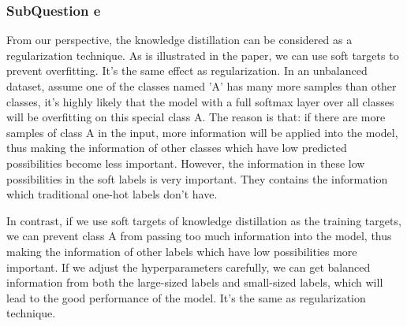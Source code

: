 \documentclass[conference]{IEEEtran}
\begin{document}
  \subsubsection{SubQuestion e}
  From our perspective, the knowledge distillation can be considered as a regularization technique. As is illustrated in the paper\cite{b6}, we can use soft targets to prevent overfitting. It's the same effect as regularization.
  In an unbalanced dataset, assume one of the classes named 'A' has many more samples than other classes, it's highly likely that the model with a full softmax layer over all classes will be overfitting on this special class A.
  The reason is that: if there are more samples of class A in the input, more information will be applied into the model, thus making the information of other classes which have low predicted possibilities become less important. 
  However, the information in these low possibilities in the soft labels is very important. They contains the information which traditional one-hot labels don't have. 
  \par
  In contrast, if we use soft targets of knowledge distillation as the training targets, we can prevent class A from passing too much information into the model, thus making the information of other labels which have low possibilities more important.
  If we adjust the hyperparameters carefully, we can get balanced information from both the large-sized labels and small-sized labels, which will lead to the good performance of the model. It's the same as regularization technique.
  
\end{document}
